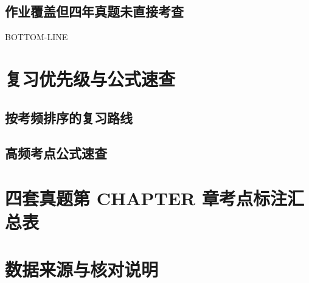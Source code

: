 \documentclass[11pt]{ctexart}
\begin{document}
\subsection{作业覆盖但四年真题未直接考查}
\begin{keybox}[title={对接分析结论}]
BOTTOM-LINE
\end{keybox}

\section{复习优先级与公式速查}
\subsection{按考频排序的复习路线}
\subsection{高频考点公式速查}

\appendix
\section{四套真题第 CHAPTER 章考点标注汇总表}
\section{数据来源与核对说明}
\end{document}

